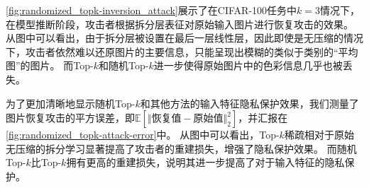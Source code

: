 \autoref{fig:randomized_topk-inversion_attack}展示了在CIFAR-100任务中$k=3$情况下，在模型推断阶段，攻击者根据拆分层表征对原始输入图片进行恢复攻击的效果。
从图中可以看出，由于拆分层被设置在最后一层线性层，因此即使是无压缩的情况下，攻击者依然难以还原图片的主要信息，只能呈现出模糊的类似于类别的“平均图”的图片。
%
而Top-$k$和随机Top-$k$进一步使得原始图片中的色彩信息几乎也被丢失。
%

为了更加清晰地显示随机Top-$k$和其他方法的输入特征隐私保护效果，我们测量了图片恢复攻击的平方误差，即$\mathbb E\left[ \Vert \text{恢复值} - \text{原始值} \Vert_2^2 \right]$，并汇报在\autoref{fig:randomized_topk-attack-error}中。
%
从图中可以看出，Top-$k$稀疏相对于原始无压缩的拆分学习显著提高了攻击者的重建损失，增强了隐私保护效果。
而随机Top-$k$比Top-$k$拥有更高的重建损失，说明其进一步提高了对于输入特征的隐私保护。


